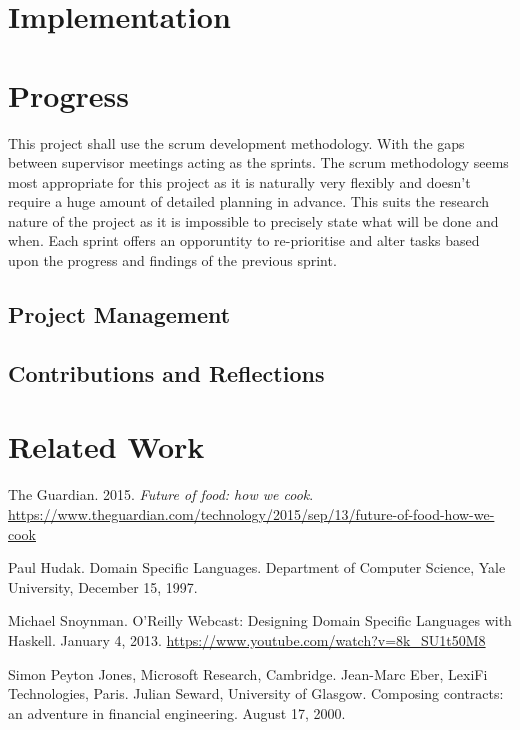 \documentclass[11pt]{article}
\begin{document}
    
    \section{Implementation}

    \section{Progress}
    This project shall use the scrum development methodology. With the
    gaps between supervisor meetings acting as the sprints. The scrum
    methodology seems most appropriate for this project as it is naturally
    very flexibly and doesn't require a huge amount of detailed planning
    in advance. This suits the research nature of the project as it is
    impossible to precisely state what will be done and when. Each sprint
    offers an opporuntity to re-prioritise and alter tasks based upon
    the progress and findings of the previous sprint.
    \subsection{Project Management}
    \subsection{Contributions and Reflections}

    \section{Related Work}

    \newpage
    \begin{thebibliography}{0}

        The Guardian. 2015. \textit{Future of food: how we cook}.
        \url{https://www.theguardian.com/technology/2015/sep/13/future-of-food-how-we-cook}

        Paul Hudak. Domain Specific Languages. Department of Computer
        Science, Yale University, December 15, 1997.

        Michael Snoynman. O'Reilly Webcast: Designing Domain Specific
        Languages with Haskell. January 4, 2013.
        \url{https://www.youtube.com/watch?v=8k_SU1t50M8}

        Simon Peyton Jones, Microsoft Research, Cambridge.
        Jean-Marc Eber, LexiFi Technologies, Paris. Julian Seward,
        University of Glasgow. Composing contracts: an adventure in
        financial engineering. August 17, 2000.


    \end{thebibliography}   
     
\end{document}
